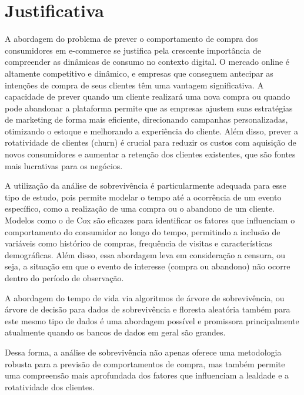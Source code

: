 
\section{Justificativa}


A abordagem do problema de prever o comportamento de compra dos consumidores em e-commerce se justifica pela crescente importância de compreender as dinâmicas de consumo no contexto digital. O mercado online é altamente competitivo e dinâmico, e empresas que conseguem antecipar as intenções de compra de seus clientes têm uma vantagem significativa. A capacidade de prever quando um cliente realizará uma nova compra ou quando pode abandonar a plataforma permite que as empresas ajustem suas estratégias de marketing de forma mais eficiente, direcionando campanhas personalizadas, otimizando o estoque e melhorando a experiência do cliente. Além disso, prever a rotatividade de clientes (churn) é crucial para reduzir os custos com aquisição de novos consumidores e aumentar a retenção dos clientes existentes, que são fontes mais lucrativas para os negócios.

A utilização da análise de sobrevivência é particularmente adequada para esse tipo de estudo, pois permite modelar o tempo até a ocorrência de um evento específico, como a realização de uma compra ou o abandono de um cliente. Modelos como o de Cox são eficazes para identificar os fatores que influenciam o comportamento do consumidor ao longo do tempo, permitindo a inclusão de variáveis como histórico de compras, frequência de visitas e características demográficas. Além disso, essa abordagem leva em consideração a censura, ou seja, a situação em que o evento de interesse (compra ou abandono) não ocorre dentro do período de observação.

A abordagem do tempo de vida via algoritmos de árvore de sobrevivência, ou árvore de decisão para dados de sobrevivência e floresta aleatória também para este mesmo tipo de dados é uma abordagem possível e promissora principalmente atualmente quando os bancos de dados em geral são grandes.

Dessa forma, a análise de sobrevivência não apenas oferece uma metodologia robusta para a previsão de comportamentos de compra, mas também permite uma compreensão mais aprofundada dos fatores que influenciam a lealdade e a rotatividade dos clientes. \cite{sobrevivencia}